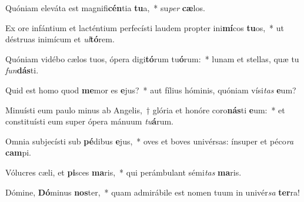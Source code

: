 \item Quóniam eleváta est magnifi\textbf{cén}tia \textbf{tu}a,~* su\textit{per} \textbf{cæ}los.
\item Ex ore infántium et lacténtium perfecísti laudem propter ini\textbf{mí}cos \textbf{tu}os,~* ut déstruas inimícum et \textit{ul}\textbf{tó}rem.
\item Quóniam vidébo cælos tuos, ópera digi\textbf{tó}rum tu\textbf{ó}rum:~* lunam et stellas, quæ tu \textit{fun}\textbf{dás}ti.
\item Quid est homo quod \textbf{me}mor es \textbf{e}jus?~* aut fílius hóminis, quóniam vísi\textit{tas} \textbf{e}um?
\item Minuísti eum paulo minus ab Angelis,~† glória et honóre coro\textbf{nás}ti \textbf{e}um:~* et constituísti eum super ópera mánuum \textit{tu}\textbf{á}rum.
\item Omnia subjecísti sub \textbf{pé}dibus \textbf{e}jus,~* oves et boves univérsas: ínsuper et péco\textit{ra} \textbf{cam}pi.
\item Vólucres cæli, et \textbf{pi}sces \textbf{ma}ris,~* qui perámbulant sémi\textit{tas} \textbf{ma}ris.
\item Dómine, \textbf{Dó}minus \textbf{nos}ter,~* quam admirábile est nomen tuum in univér\textit{sa} \textbf{ter}ra!
